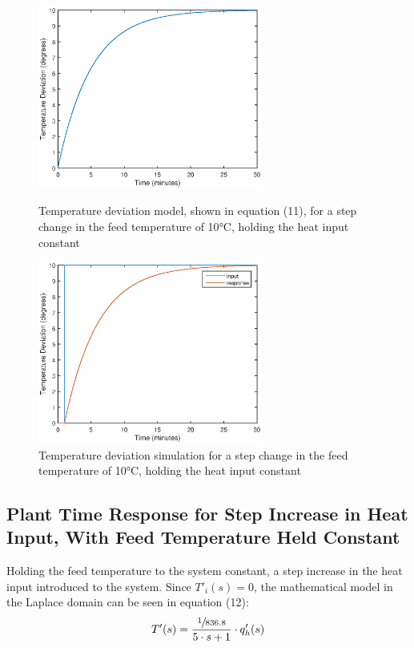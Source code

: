 \documentclass{article}
\begin{document}
\begin{figure}[h]
\begin{minipage}{0.45\textwidth}
\centering
\includegraphics[height=6cm]{1a_mod}
\caption{Temperature deviation model, shown in equation (11), for a step change in the feed temperature of 10$\si{\degreeCelsius}$, holding the heat input constant}
\end{minipage}
\hspace{1cm}
\begin{minipage}{0.45\textwidth}
\centering
\includegraphics[height=6cm]{1a_sim}
\caption{Temperature deviation simulation for a step change in the feed temperature of 10$\si{\degreeCelsius}$, holding the heat input constant}
\end{minipage}
\end{figure}

\subsection{Plant Time Response for Step Increase in Heat Input, With Feed Temperature Held Constant}
Holding the feed temperature to the system constant, a step increase in the heat input introduced to the system. Since $T'_i(s)=0$, the mathematical model in the Laplace domain can be seen in equation (12):
\begin{align}
T'(s) = \frac{\sfrac{1}{836.8}}{5 \cdot s + 1} \cdot q'_h(s)
\end{align} 
\end{document}
